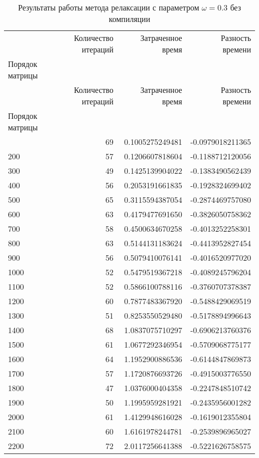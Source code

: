 \begin{longtable}{lrrr}
\caption{Результаты работы метода релаксации с параметром $\omega=0.3$ без компиляции}\\
\toprule
 & Количество итераций & Затраченное время & Разность времени \\
Порядок матрицы &  &  &  \\
\midrule
\endfirsthead
\toprule
 & Количество итераций & Затраченное время & Разность времени \\
Порядок матрицы &  &  &  \\
\midrule
\endhead
\midrule
\midrule
\endfoot
\bottomrule
\endlastfoot
100 & 69 & 0.1005275249481 & -0.0979018211365 \\
200 & 57 & 0.1206607818604 & -0.1188712120056 \\
300 & 49 & 0.1425139904022 & -0.1383490562439 \\
400 & 56 & 0.2053191661835 & -0.1928324699402 \\
500 & 65 & 0.3115594387054 & -0.2874469757080 \\
600 & 63 & 0.4179477691650 & -0.3826050758362 \\
700 & 58 & 0.4500634670258 & -0.4013252258301 \\
800 & 63 & 0.5144131183624 & -0.4413952827454 \\
900 & 56 & 0.5079410076141 & -0.4016520977020 \\
1000 & 52 & 0.5479519367218 & -0.4089245796204 \\
1100 & 52 & 0.5866100788116 & -0.3760707378387 \\
1200 & 60 & 0.7877483367920 & -0.5488429069519 \\
1300 & 51 & 0.8253550529480 & -0.5178894996643 \\
1400 & 68 & 1.0837075710297 & -0.6906213760376 \\
1500 & 61 & 1.0677292346954 & -0.5709068775177 \\
1600 & 64 & 1.1952900886536 & -0.6144847869873 \\
1700 & 57 & 1.1720876693726 & -0.4915003776550 \\
1800 & 47 & 1.0376000404358 & -0.2247848510742 \\
1900 & 50 & 1.1995959281921 & -0.2435956001282 \\
2000 & 61 & 1.4129948616028 & -0.1619012355804 \\
2100 & 60 & 1.6161978244781 & -0.2539896965027 \\
2200 & 72 & 2.0117256641388 & -0.5221626758575 \\

\end{longtable}
